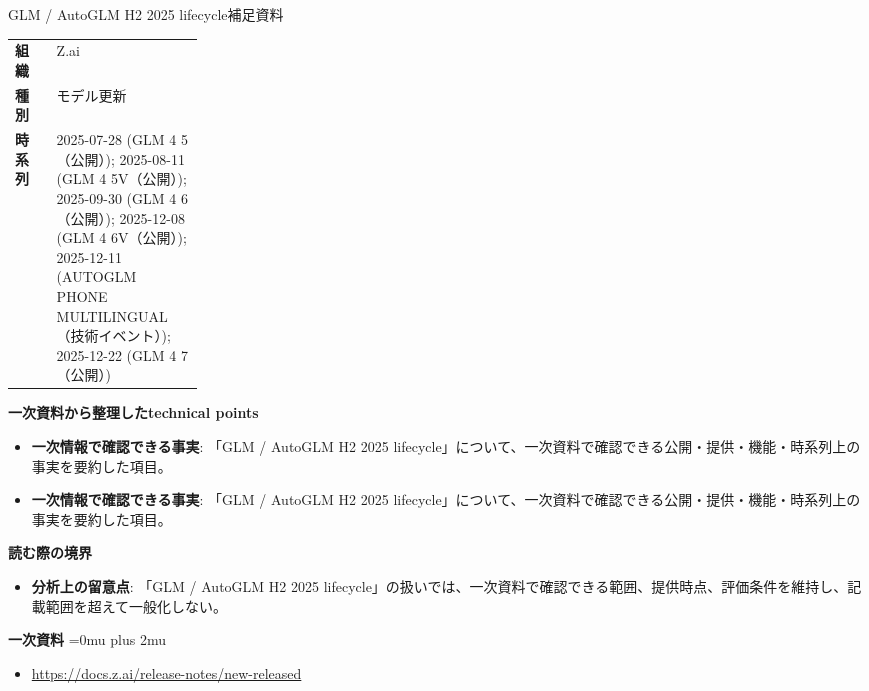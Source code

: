 \begin{technicalnote}{GLM / AutoGLM H2 2025 lifecycle}{補足資料}
\begingroup
\begin{tabularx}{\linewidth}{@{}>{\bfseries}p{0.22\linewidth}X@{}}
組織 & Z.ai \\
種別 & モデル更新 \\
時系列 & 2025-07-28 (GLM 4 5（公開）); 2025-08-11 (GLM 4 5V（公開）); 2025-09-30 (GLM 4 6（公開）); 2025-12-08 (GLM 4 6V（公開）); 2025-12-11 (AUTOGLM PHONE MULTILINGUAL（技術イベント）); 2025-12-22 (GLM 4 7（公開）) \\
\end{tabularx}
\smallskip
{\bfseries 一次資料から整理したtechnical points}
\begin{itemize}[leftmargin=1.5em,itemsep=0.35em]
\item \textbf{一次情報で確認できる事実}: 「GLM / AutoGLM H2 2025 lifecycle」について、一次資料で確認できる公開・提供・機能・時系列上の事実を要約した項目。
\item \textbf{一次情報で確認できる事実}: 「GLM / AutoGLM H2 2025 lifecycle」について、一次資料で確認できる公開・提供・機能・時系列上の事実を要約した項目。
\end{itemize}
\begin{minipage}{\linewidth}
{\bfseries 読む際の境界}
\begin{itemize}[leftmargin=1.5em,itemsep=0.35em]
\item \textbf{分析上の留意点}: 「GLM / AutoGLM H2 2025 lifecycle」の扱いでは、一次資料で確認できる範囲、提供時点、評価条件を維持し、記載範囲を超えて一般化しない。
\end{itemize}
\begin{samepage}
{\bfseries 一次資料}
\begingroup\sloppy
\Urlmuskip=0mu plus 2mu\relax
\begin{itemize}[leftmargin=1.5em,itemsep=0.25em]
\item {\scriptsize\url{https://docs.z.ai/release-notes/new-released}}
\end{itemize}
\endgroup
\end{samepage}
\end{minipage}
\endgroup
\end{technicalnote}
\medskip
